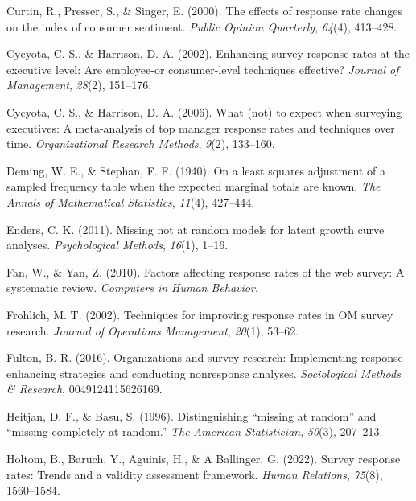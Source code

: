 \documentclass[
  man,mask]{apa7}
\newlength{\cslhangindent}
\newenvironment{CSLReferences}[2] %
 {\begin{list}{}{%
  \setlength{\itemindent}{0pt}
  \setlength{\leftmargin}{0pt}
  \setlength{\parsep}{0pt}
  \ifodd #1
   \setlength{\leftmargin}{\cslhangindent}
   \setlength{\itemindent}{-1\cslhangindent}
  \fi
  \setlength{\itemsep}{#2\baselineskip}}}
 {\end{list}}
\begin{document}
\begin{CSLReferences}{1}{0}
Curtin, R., Presser, S., \& Singer, E. (2000). The effects of response rate changes on the index of consumer sentiment. \emph{Public Opinion Quarterly}, \emph{64}(4), 413--428.

Cycyota, C. S., \& Harrison, D. A. (2002). Enhancing survey response rates at the executive level: Are employee-or consumer-level techniques effective? \emph{Journal of Management}, \emph{28}(2), 151--176.

Cycyota, C. S., \& Harrison, D. A. (2006). What (not) to expect when surveying executives: A meta-analysis of top manager response rates and techniques over time. \emph{Organizational Research Methods}, \emph{9}(2), 133--160.

Deming, W. E., \& Stephan, F. F. (1940). On a least squares adjustment of a sampled frequency table when the expected marginal totals are known. \emph{The Annals of Mathematical Statistics}, \emph{11}(4), 427--444.

Enders, C. K. (2011). Missing not at random models for latent growth curve analyses. \emph{Psychological Methods}, \emph{16}(1), 1--16.

Fan, W., \& Yan, Z. (2010). Factors affecting response rates of the web survey: A systematic review. \emph{Computers in Human Behavior}.

Frohlich, M. T. (2002). Techniques for improving response rates in {OM} survey research. \emph{Journal of Operations Management}, \emph{20}(1), 53--62.

Fulton, B. R. (2016). Organizations and survey research: Implementing response enhancing strategies and conducting nonresponse analyses. \emph{Sociological Methods \& Research}, 0049124115626169.

Heitjan, D. F., \& Basu, S. (1996). Distinguishing {``missing at random''} and {``missing completely at random.''} \emph{The American Statistician}, \emph{50}(3), 207--213.

Holtom, B., Baruch, Y., Aguinis, H., \& A Ballinger, G. (2022). Survey response rates: Trends and a validity assessment framework. \emph{Human Relations}, \emph{75}(8), 1560--1584.


\end{CSLReferences}
\end{document}
